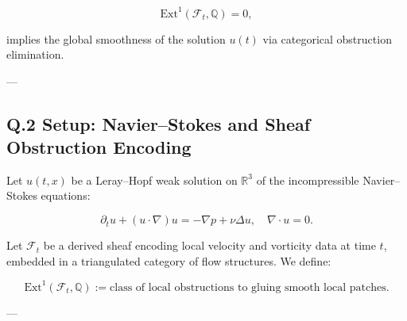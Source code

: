 \documentclass[11pt]{article}
\begin{document}
\[
\mathrm{Ext}^1(\mathcal{F}_t, \mathbb{Q}) = 0,
\]

implies the global smoothness of the solution $u(t)$ via categorical obstruction elimination.

---

\subsection*{Q.2 Setup: Navier–Stokes and Sheaf Obstruction Encoding}

Let $u(t,x)$ be a Leray–Hopf weak solution on $\mathbb{R}^3$ of the incompressible Navier–Stokes equations:

\[
\partial_t u + (u \cdot \nabla)u = -\nabla p + \nu \Delta u, \quad \nabla \cdot u = 0.
\]

Let $\mathcal{F}_t$ be a derived sheaf encoding local velocity and vorticity data at time $t$, embedded in a triangulated category of flow structures. We define:

\[
\mathrm{Ext}^1(\mathcal{F}_t, \mathbb{Q}) := \text{class of local obstructions to gluing smooth local patches}.
\]

---
\end{document}
